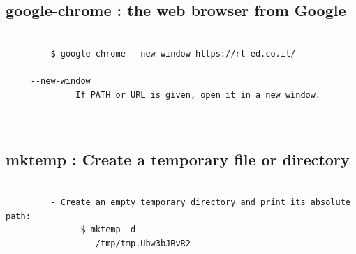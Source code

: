 \documentclass[a4paper,12pt]{article}
\begin{document}
\subsection{google-chrome : the web browser from Google }
\begin{verbatim}

         $ google-chrome --new-window https://rt-ed.co.il/
         
     --new-window
              If PATH or URL is given, open it in a new window.
    


\end{verbatim}



\subsection{mktemp : Create a temporary file or directory }
\begin{verbatim}

         - Create an empty temporary directory and print its absolute path:
               $ mktemp -d
                  /tmp/tmp.Ubw3bJBvR2


\end{verbatim}
\end{document}

